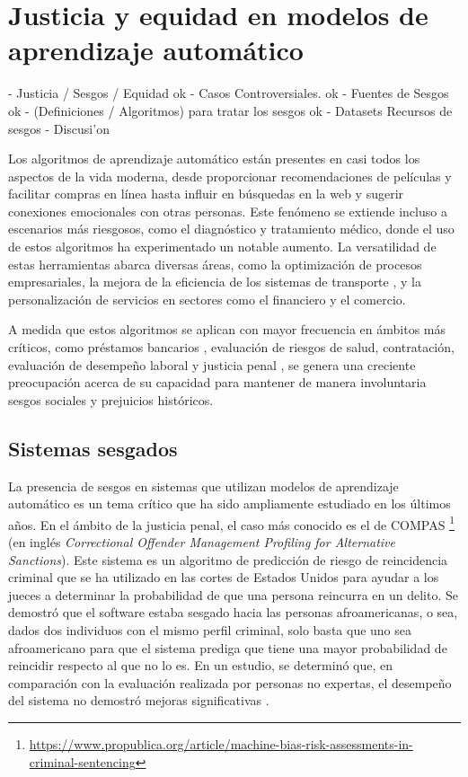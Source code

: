 \chapter{Justicia y equidad en modelos de aprendizaje autom\'atico}\label{chapter:state-of-the-art}

- Justicia / Sesgos / Equidad ok
- Casos Controversiales. ok
- Fuentes de Sesgos ok
- (Definiciones / Algoritmos) para tratar los sesgos ok
- Datasets Recursos de sesgos
- Discusi'on

Los algoritmos de aprendizaje autom\'atico est\'an presentes en casi todos los aspectos de la vida moderna,
desde proporcionar recomendaciones de pel\'iculas y facilitar compras en l\'inea hasta influir en b\'usquedas en la web
y sugerir conexiones emocionales con otras personas. Este fen\'omeno se extiende incluso a escenarios m\'as riesgosos,
como el diagn\'ostico y tratamiento m\'edico, donde el uso de estos algoritmos ha experimentado un notable aumento.
La versatilidad de estas herramientas abarca diversas \'areas, como la optimizaci\'on de procesos empresariales, la 
mejora de la eficiencia de los sistemas de transporte \parencite{autonomous_driving}, y la personalizaci\'on de servicios en 
sectores como el financiero y el comercio.

A medida que estos algoritmos se aplican con mayor frecuencia en \'ambitos m\'as cr\'iticos, como
pr\'estamos bancarios \parencite{fairness_def}, evaluaci\'on de riesgos de salud, contrataci\'on, evaluaci\'on de desempe\~no laboral y
justicia penal \parencite{compas}, se genera una creciente preocupaci\'on acerca de su capacidad para mantener de manera involuntaria 
sesgos sociales y prejuicios hist\'oricos. 

\section{Sistemas sesgados}

    La presencia de sesgos en sistemas que utilizan modelos de aprendizaje autom\'atico es un tema cr\'itico que ha sido
    ampliamente estudiado en los \'ultimos a\~nos. En el \'ambito de la justicia penal, el caso m\'as conocido es el de COMPAS
    \footnote{\url{https://www.propublica.org/article/machine-bias-risk-assessments-in-criminal-sentencing}}
    (en ingl\'es \textit{Correctional Offender Management Profiling for Alternative Sanctions}). Este sistema es un algoritmo de predicci\'on
    de riesgo de reincidencia criminal que se ha utilizado en las cortes de Estados Unidos para ayudar a los jueces a determinar la 
    probabilidad de que una persona reincurra en un delito. Se demostr\'o que el software estaba sesgado hacia las personas 
    afroamericanas, o sea, dados dos individuos con el mismo perfil criminal, solo basta que uno sea afroamericano para que el
    sistema prediga que tiene una mayor probabilidad de reincidir respecto al que no lo es. En un estudio, se determin\'o que, 
    en comparaci\'on con la evaluaci\'on realizada por personas no expertas, el desempe\~no del sistema no demostr\'o mejoras 
    significativas \parencite{compas2}. 

